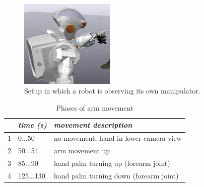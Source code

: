 
\begin{figure}
\centering
\includegraphics[width=0.4\textwidth]{images/eval_vicon/sequence/setting.png}
\caption{Setup in which a robot is observing its own manipulator.}
\label{fig:vicon_free_movement}
\end{figure}

\begin{table}
\centering
\begin{tabular}{|c|l|l|}
\hline
 & \emph{time (s)} & \emph{movement description} \\
\hline
1 & 0$\dots$50 & no movement, hand in lower camera view \\
\hline
2 & 50$\dots$54 & arm movement up \\
\hline
3 & 85$\dots$90 & hand palm turning up (forearm joint) \\
\hline
4 & 125$\dots$130 & hand palm turning down (forearm joint) \\
\hline
\end{tabular}
\caption{Phases of arm movement}
\label{tab:vic_arm_movement_phases}
\end{table}

